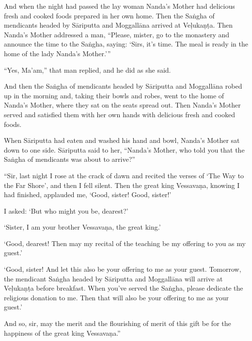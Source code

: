 \documentclass[12pt,openany]{book}%
\begin{document}
And when the night had passed the lay woman Nanda’s Mother had delicious fresh and cooked foods prepared in her own home. Then the \textsanskrit{Saṅgha} of mendicants headed by \textsanskrit{Sāriputta} and \textsanskrit{Moggallāna} arrived at \textsanskrit{Veḷukaṇṭa}. Then Nanda’s Mother addressed a man, “Please, mister, go to the monastery and announce the time to the \textsanskrit{Saṅgha}, saying: ‘Sirs, it’s time. The meal is ready in the home of the lady Nanda’s Mother.’” 

“Yes, Ma’am,” that man replied, and he did as she said. 

And then the \textsanskrit{Saṅgha} of mendicants headed by \textsanskrit{Sāriputta} and \textsanskrit{Moggallāna} robed up in the morning and, taking their bowls and robes, went to the home of Nanda’s Mother, where they sat on the seats spread out. Then Nanda’s Mother served and satisfied them with her own hands with delicious fresh and cooked foods. 

When \textsanskrit{Sāriputta} had eaten and washed his hand and bowl, Nanda’s Mother sat down to one side. \textsanskrit{Sāriputta} said to her, “Nanda’s Mother, who told you that the \textsanskrit{Saṅgha} of mendicants was about to arrive?” 

“Sir, last night I rose at the crack of dawn and recited the verses of ‘The Way to the Far Shore’, and then I fell silent. Then the great king \textsanskrit{Vessavaṇa}, knowing I had finished, applauded me, ‘Good, sister! Good, sister!’ 

I asked: ‘But who might you be, dearest?’ 

‘Sister, I am your brother \textsanskrit{Vessavaṇa}, the great king.’ 

‘Good, dearest! Then may my recital of the teaching be my offering to you as my guest.’ 

‘Good, sister! And let this also be your offering to me as your guest. Tomorrow, the mendicant \textsanskrit{Saṅgha} headed by \textsanskrit{Sāriputta} and \textsanskrit{Moggallāna} will arrive at \textsanskrit{Veḷukaṇṭa} before breakfast. When you’ve served the \textsanskrit{Saṅgha}, please dedicate the religious donation to me. Then that will also be your offering to me as your guest.’ 

And so, sir, may the merit and the flourishing of merit of this gift be for the happiness of the great king \textsanskrit{Vessavaṇa}.” 
\end{document}
